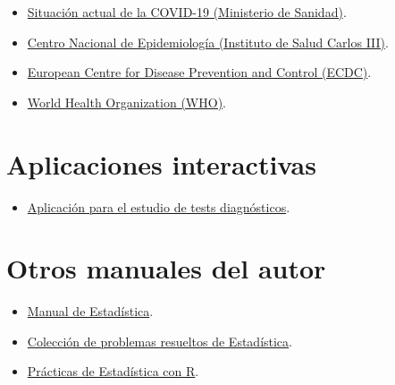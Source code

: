 \documentclass[
  spanish,
  a4paper,
]{scrreport}
\providecommand{\tightlist}{%
  \setlength{\itemsep}{0pt}\setlength{\parskip}{0pt}}
\theoremstyle{definition}
\theoremstyle{definition}
\theoremstyle{remark}
\begin{document}
\begin{itemize}
\tightlist
\item
  \href{https://www.sanidad.gob.es/profesionales/saludPublica/ccayes/alertasActual/nCov/situacionActual.htm}{Situación
  actual de la COVID-19 (Ministerio de Sanidad)}.
\item
  \href{https://www.isciii.es/QueHacemos/Servicios/VigilanciaSaludPublicaRENAVE/Paginas/default.aspx}{Centro
  Nacional de Epidemiología (Instituto de Salud Carlos III)}.
\item
  \href{https://www.ecdc.europa.eu/en/data}{European Centre for Disease
  Prevention and Control (ECDC)}.
\item
  \href{https://www.who.int/data}{World Health Organization (WHO)}.
\end{itemize}

\section*{Aplicaciones interactivas}\label{aplicaciones-interactivas}


\begin{itemize}
\tightlist
\item
  \href{http://nube.aprendeconalf.es/shiny/diagnostic-test/}{Aplicación
  para el estudio de tests diagnósticos}.
\end{itemize}

\section*{Otros manuales del autor}\label{otros-manuales-del-autor}


\begin{itemize}
\tightlist
\item
  \href{https://aprendeconalf.es/estadistica-manual/}{Manual de
  Estadística}.
\item
  \href{https://aprendeconalf.es/estadistica-ejercicios/}{Colección de
  problemas resueltos de Estadística}.
\item
  \href{https://aprendeconalf.es/estadistica-practicas-r/}{Prácticas de
  Estadística con R}.
\end{itemize}
\end{document}
